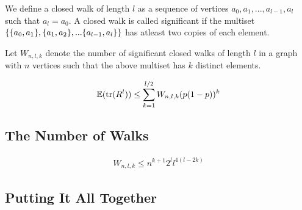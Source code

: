 \documentclass{math}
\newcommand{\expect}{\mathbb{E}}
\begin{document}
We define a closed walk of length $l$ as a sequence of vertices $a_0, a_1, ..., a_{l - 1}, a_l$ such that $a_l = a_0$.
A closed walk is called significant if the multiset $\{ \{ a_0, a_1 \}, \{ a_1, a_2 \}, ... \{ a_{l-1}, a_l \} \}$ has atleast two copies of each element.

\begin{definition}
    Let $W_{n, l, k}$ denote the number of significant closed walks of length $l$ in a graph with $n$ vertices such that the above multiset has $k$ distinct elements.
\end{definition}

\begin{lemma}
    \begin{align*}
        \expect(\trace(R^l)) \leq \sum_{k = 1}^{l / 2} W_{n, l, k} (p(1-p))^k
    \end{align*}
\end{lemma}

\subsection{The Number of Walks}

\begin{lemma}
    \begin{align*}
        W_{n, l, k} \leq n^{k + 1}2^ll^{4(l - 2k)}
    \end{align*}
\end{lemma}

\subsection{Putting It All Together}
\end{document}
